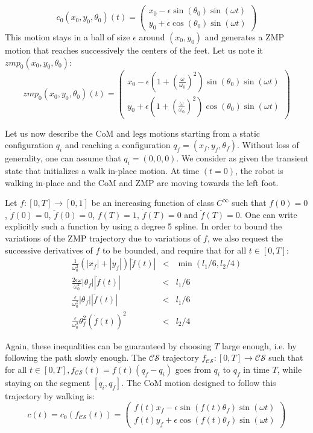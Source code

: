 \documentclass{article}
\begin{document}
\[
c_0(x_0,y_0,\theta_0)(t) = 
\left(
\begin{array}{c}
x_0 - \epsilon \sin (\theta_0) \sin (\omega t) \\
y_0 + \epsilon \cos (\theta_0) \sin (\omega t) 
\end{array}
\right)
\]
This motion stays in a  ball of size $\epsilon$ around $(x_0,y_0)$ and
generates a  ZMP motion that  reaches successively the centers  of the
feet. Let us note it $zmp_0(x_0,y_0,\theta_0)$:
\[
zmp_0(x_0,y_0,\theta_0)(t) = 
\left(
\begin{array}{c}
x_0 - \epsilon (1+\left( \frac{\omega}{\omega_0} \right)^2)\sin ( \theta_0) \sin (\omega t)   \\
y_0 + \epsilon (1+\left( \frac{\omega}{\omega_0} \right)^2)\cos ( \theta_0) \sin (\omega t)
\end{array}
\right)
\]

Let us now describe the CoM and legs motions starting from a static configuration $q_i$ 
and reaching a configuration $q_f = (x_f,y_f,\theta_f)$. Without loss of generality, one can
assume that $q_i = (0,0,0)$. We consider as given the transient state that initializes a walk
in-place motion. At time $(t=0)$, the robot is walking in-place and the CoM and ZMP are 
moving towards the left foot.

Let $f : [0,T] \rightarrow [0,1]$ be an increasing function of class $C^\infty$  such  
that  $f(0)  =  0$, $\dot{f}(0) = 0$, $\ddot{f}(0) = 0$, $f(T) = 1$, $\dot{f}(T) = 0$ and
$\ddot{f}(T) = 0$. One can write explicitly such a function by using a degree 5 spline.
In order to bound the variations of the ZMP trajectory due to variations of $f$, we also 
request the successive derivatives of $f$ to be bounded, and require
that for all $t \in [0,T]$:
\[
\begin{array}{rcl}
\frac{1}{\omega_0^2}(|x_f|+|y_f|)|\ddot{f}(t)| & < &
\min(l_1/6,l_2/4)\\
\frac{2\epsilon\omega}{\omega_0^2}|\theta_f||\dot{f}(t)| & < & l_1/6
\\
\frac{\epsilon}{\omega_0^2}|\theta_f||\ddot{f}(t)| & < & l_1/6 \\
\frac{\epsilon}{\omega_0^2}\theta_f^2\left(\dot{f}(t)\right)^2 & < &
l_2/4
\end{array}
\]


Again, these inequalities can be guaranteed by choosing $T$ large
enough, i.e. by following the path slowly enough. The $\mathcal{CS}$
trajectory $f_{\mathcal{CS}} : [0,T] \rightarrow \mathcal{CS}$ such
that for all $t \in [0,T],f_{\mathcal{CS}}(t) = f(t)(q_f - q_i)$ goes
from $q_i$ to $q_f$ in time $T$, while staying on the segment
$[q_i,q_f]$. The CoM motion designed to follow this trajectory by
walking is:
\[
\label{eq:com-walk}
c(t) = c_0 (f_{\mathcal{CS}}(t)) =
\left(
\begin{array}{c}
f(t) x_f - \epsilon \sin ( f(t) \theta_f) \sin (\omega t) \\
f(t) y_f + \epsilon \cos ( f(t) \theta_f) \sin (\omega t)
\end{array}
\right)
\]
\end{document}
